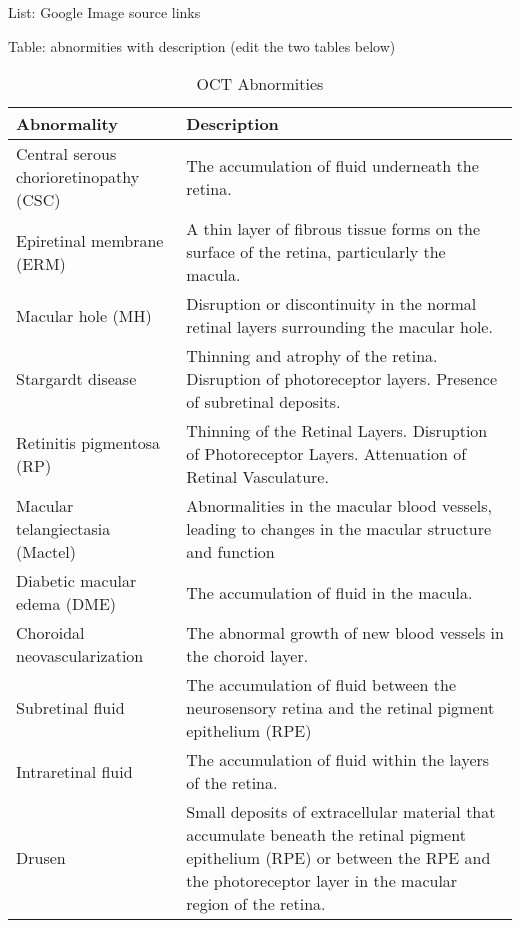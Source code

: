 \documentclass{article}
\begin{document}
	List: Google Image source links
	
	Table: abnormities with description (edit the two tables below)
	
	{
		\fontsize{9}{12}\selectfont
		{
			\begin{longtable}{lp{3.8in}}
				\caption{OCT Abnormities}
				\label{tb:oct-abnormites}\\
				\toprule
				Abnormality&Description\\
				\toprule
				
				\multicolumn{1}{l}{Central serous chorioretinopathy (CSC)}
				& \multicolumn{1}{l}{The accumulation of fluid underneath the retina.}\\
				
				\multicolumn{1}{l}{Epiretinal membrane (ERM)}
				& A thin layer of fibrous tissue forms on the surface of the retina, particularly the macula.\\
				
				\multicolumn{1}{l}{Macular hole (MH)}
				& Disruption or discontinuity in the normal retinal layers surrounding the macular hole.\\
				
				\multicolumn{1}{l}{Stargardt disease}
				& Thinning and atrophy of the retina. Disruption of photoreceptor layers. Presence of subretinal deposits.\\
				
				\multicolumn{1}{l}{Retinitis pigmentosa (RP)}
				& Thinning of the Retinal Layers. Disruption of Photoreceptor Layers. Attenuation of Retinal Vasculature.\\
				
				\multicolumn{1}{l}{Macular telangiectasia (Mactel)}
				& Abnormalities in the macular blood vessels, leading to changes in the macular structure and function\\
				
				\multicolumn{1}{l}{Diabetic macular edema (DME)}
				& The accumulation of fluid in the macula. \\
				
				\multicolumn{1}{l}{Choroidal neovascularization}
				& The abnormal growth of new blood vessels in the choroid layer.\\
				
				\multicolumn{1}{l}{Subretinal fluid}
				&  The accumulation of fluid between the neurosensory retina and the retinal pigment epithelium (RPE)\\
				
				\multicolumn{1}{l}{Intraretinal fluid}
				& The accumulation of fluid within the layers of the retina.\\
				
				\multicolumn{1}{l}{Drusen}
				& Small deposits of extracellular material that accumulate beneath the retinal pigment epithelium (RPE) or between the RPE and the photoreceptor layer in the macular region of the retina.\\
				
				\bottomrule
			\end{longtable}
		}
	}
	
\end{document}
